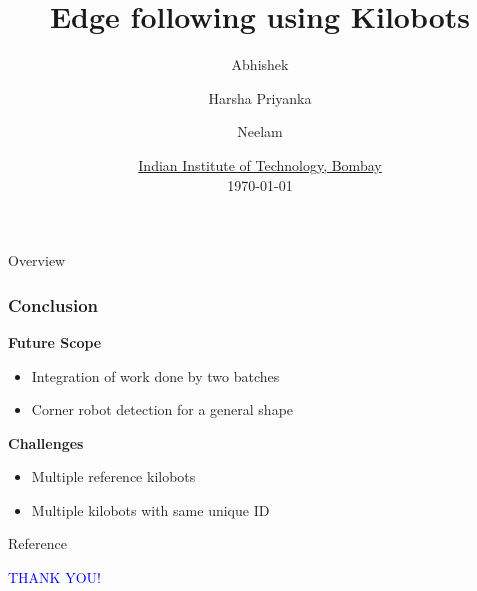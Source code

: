 \documentclass[12pt,xcolor=table]{beamer}
\title[Edge following using Kilobots]{Edge following using Kilobots}
\author[Abhishek, Harsha Priyanka, Neelam]{Abhishek\inst{1} \and Harsha Priyanka\inst{1} \and Neelam\inst{1}}
\institute[IIT Bombay] %
{
  \inst{1}%
  M.Tech scholar\\
  Systems and Control Engineering
}
\date[] 
{\href{http://www.iitb.ac.in/}{Indian Institute of Technology, Bombay}\\\today}
\begin{document}
\begin{frame}
   \titlepage
\end{frame}



\begin{frame}{Overview}
\tableofcontents
\end{frame}






\begin{frame}
\frametitle{Conclusion}
\textbf{Future Scope}
\begin{itemize}
    \item Integration of work done by two batches
    \item Corner robot detection for a general shape
\end{itemize}
\vspace{0.2cm}
\newline
\textbf{Challenges}
\begin{itemize}
	\item Multiple reference kilobots
	\item Multiple kilobots with same unique ID
\end{itemize}
\end{frame}

\begin{frame}[allowframebreaks]{Reference}
\AtNextBibliography{\small}
\printbibliography
\end{frame}

\begin{frame}
  \begin{center}
  \textcolor{blue}{\Large THANK YOU!} 
  \end{center}
\end{frame}
\end{document}
